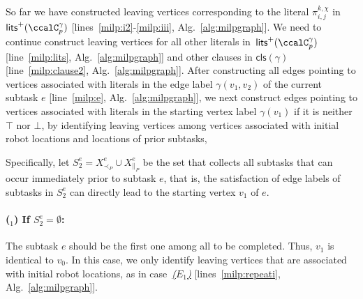 \documentclass[Afour,sageh,times]{sagej}
\newcounter{mycounter}
\newcommand{\clause}[1]{\mathsf{cls}(#1)}
\renewcommand{\ap}[3]{\mathcal{\pi}_{{#1},{#2}}^{#3}}
\begin{document}
So far we have constructed leaving vertices corresponding to the literal $\ap{i}{j}{k,\chi}$ in $\mathsf{lits}^+(\ccalC_p^{\gamma})$ [lines~\ref{milp:i2}-\ref{milp:iii}, Alg.~\ref{alg:milpgraph}]. We need to continue construct leaving vertices for all other literals in~$\mathsf{lits}^+(\ccalC_p^{\gamma})$ [line~\ref{milp:lits},  Alg.~\ref{alg:milpgraph}] and other clauses in $\clause{\gamma}$ [line~\ref{milp:clause2},  Alg.~\ref{alg:milpgraph}].
After constructing all edges pointing to vertices associated with literals in the edge label $\gamma(v_1, v_2)$ of the current subtask $e$ [line~\ref{milp:e},  Alg.~\ref{alg:milpgraph}], we next construct  edges pointing to vertices associated with literals in the starting vertex label $\gamma(v_1)$ if it is  neither $\top$ nor $\bot$, by identifying leaving vertices among vertices associated with initial robot locations and locations of prior subtasks,


Specifically, let $S_2^e = X_{\prec_P}^e \cup X_{\|_P}^e$ be the set that collects all subtasks that can occur immediately prior to subtask $e$, that is, the satisfaction of edge labels  of subtasks in $S_2^e$  can directly lead to the starting vertex $v_1$ of $e$.
\paragraph{($_1$) If $S_2^e = \emptyset$:}\label{edge:vertex1} The subtask $e$ should be the first one among all to be completed. Thus, $v_1$ is identical to $v_0$. In this case,  we only identify leaving vertices that are associated with initial robot locations, as in case~\hyperref[sec:a]{\it ($E_1$)} [lines~\ref{milp:repeati},  Alg.~\ref{alg:milpgraph}].
\end{document}
